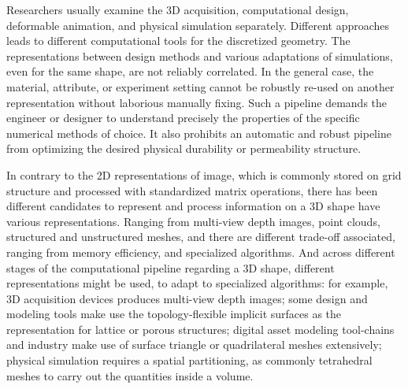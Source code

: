 Researchers usually examine the 3D acquisition, computational design, deformable animation, and physical simulation separately. Different approaches leads to different computational tools for the discretized geometry.
The representations between design methods and various adaptations of simulations, even for the same shape, are not reliably correlated.
In the general case, the material, attribute, or experiment setting cannot be robustly re-used on another representation without laborious manually fixing. Such a pipeline demands the engineer or designer to understand precisely the properties of the specific numerical methods of choice. It also prohibits an automatic and robust pipeline from optimizing the desired physical durability or permeability structure.

In contrary to the 2D representations of image, which is commonly stored on grid structure and processed with standardized matrix operations, there has been different candidates to represent and process information on a 3D shape have various representations. 
Ranging from multi-view depth images, point clouds, structured and unstructured meshes, and there are different trade-off associated, ranging from memory efficiency, and specialized algorithms. And across different stages of the computational pipeline regarding a 3D shape, different representations might be used, to adapt to specialized algorithms: for example, 3D acquisition devices produces multi-view depth images; some design and modeling tools make use the topology-flexible implicit surfaces as the representation for lattice or porous structures; digital asset modeling tool-chains and industry make use of surface triangle or quadrilateral meshes extensively; physical simulation requires a spatial partitioning, as commonly tetrahedral meshes to carry out the quantities inside a volume. 

